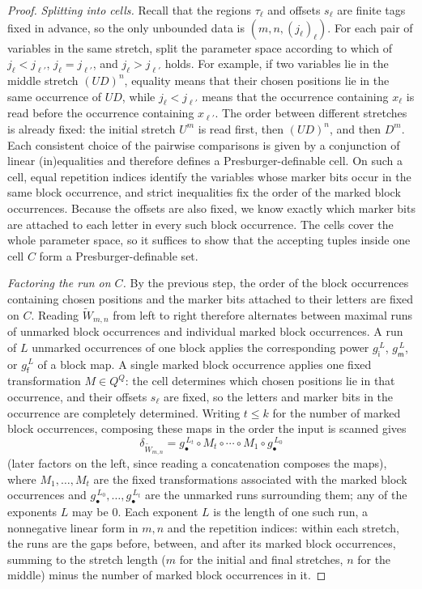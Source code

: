 \documentclass[10pt,a4paper]{amsart}
\begin{document}
\begin{proof}
\vspace{0.5em}
\noindent\emph{Splitting into cells.}  Recall that the regions $\tau_\ell$ and
offsets $s_\ell$ are finite tags fixed in advance, so the only unbounded data is
$(m,n,(j_\ell)_\ell)$.  For each pair of variables in the same stretch, split
the parameter space according to which of $j_\ell<j_{\ell'}$,
$j_\ell=j_{\ell'}$, and $j_\ell>j_{\ell'}$ holds.  For example, if two
variables lie in the middle stretch $(UD)^n$, equality means that their chosen
positions lie in the same occurrence of $UD$, while $j_\ell<j_{\ell'}$ means
that the occurrence containing $x_\ell$ is read before the occurrence
containing $x_{\ell'}$.  The order between different stretches is already
fixed: the initial stretch $U^m$ is read first, then $(UD)^n$, and then $D^m$.
Each consistent choice of the pairwise comparisons is given by a conjunction
of linear (in)equalities and therefore defines a Presburger-definable cell.  On
such a cell, equal repetition indices identify the variables whose marker bits
occur in the same block occurrence, and strict inequalities fix the order of
the marked block occurrences.  Because the offsets are also fixed, we know
exactly which marker bits are attached to each letter in every such block
occurrence.  The cells cover the whole parameter space, so it suffices to show
that the accepting tuples inside one cell $C$ form a Presburger-definable set.

\vspace{0.5em}
\noindent\emph{Factoring the run on $C$.}  By the previous step, the order of
the block occurrences containing chosen positions and the marker bits attached
to their letters are fixed on $C$.  Reading $\widetilde W_{m,n}$ from left to right therefore alternates
between maximal runs of unmarked block occurrences and individual marked block
occurrences.  A run of $L$ unmarked occurrences of one block applies the
corresponding power $g_{\mathsf i}^{\,L}$, $g_{\mathsf m}^{\,L}$, or
$g_{\mathsf f}^{\,L}$ of a block map.  A single marked block occurrence applies
one fixed transformation $M\in Q^Q$: the cell determines which chosen
positions lie in that occurrence, and their offsets $s_\ell$ are fixed, so the
letters and marker bits in the occurrence are completely determined.  Writing
$t\le k$ for the number of marked block occurrences, composing these maps in
the order the input is scanned
gives
\[
   \delta_{\widetilde W_{m,n}}
   = g_\bullet^{\,L_t}\circ M_t\circ\cdots\circ M_1\circ g_\bullet^{\,L_0}
\]
(later factors on the left, since reading a concatenation composes the maps),
where $M_1,\ldots,M_t$ are the fixed transformations associated with the
marked block occurrences and
$g_\bullet^{\,L_0},\ldots,g_\bullet^{\,L_t}$ are the unmarked runs surrounding
them; any of the exponents $L$ may be $0$.  Each exponent $L$ is the length of one such run, a
nonnegative linear form in $m,n$ and the repetition indices: within each stretch, the
runs are the gaps before, between, and after its marked block occurrences, summing to the
stretch length ($m$ for the initial and final stretches, $n$ for the middle)
minus the number of marked block occurrences in it.


\end{proof}
\end{document}
